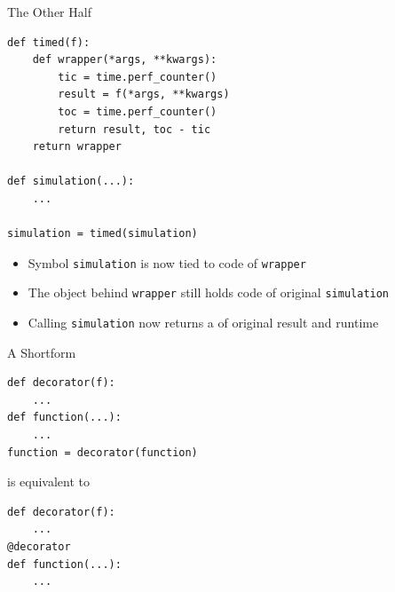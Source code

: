 
\begin{frame}[fragile]{The Other Half}
%
\begin{codebox}
\begin{verbatim}
def timed(f):
    def wrapper(*args, **kwargs):
        tic = time.perf_counter()
        result = f(*args, **kwargs)
        toc = time.perf_counter()
        return result, toc - tic
    return wrapper

def simulation(...):
    ...

simulation = timed(simulation)
\end{verbatim}
\end{codebox}
%
\small
\vspace{-6pt}
\begin{itemize}
\setlength{\itemsep}{0pt}
\item Symbol \texttt{simulation} is now tied to code of \texttt{wrapper}
\item The object behind \texttt{wrapper} still holds code of original \texttt{simulation}
\item Calling \texttt{simulation} now returns a  of original result and runtime
\end{itemize}
%
\end{frame}


\begin{frame}[fragile]{A Shortform}
%
\begin{codebox}
\begin{verbatim}
def decorator(f):
    ...
def function(...):
    ...
function = decorator(function)
\end{verbatim}
\end{codebox}
%
is equivalent to
\begin{codebox}
\begin{verbatim}
def decorator(f):
    ...
@decorator
def function(...):
    ...
\end{verbatim}
\end{codebox}
%
\end{frame}


